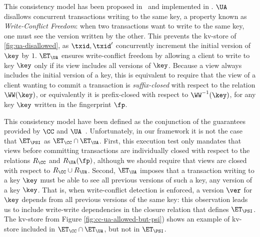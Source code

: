 This consistency model has been proposed in~\cite{framework-concur} 
and implemented in \cite{rola}.
$\UA$ disallows concurrent transactions writing to the same key,
a property known as \emph{Write-Conflict Freedom}:  
when two transactions want to write to the same key, one must see the version 
written by the other.
This prevents the kv-store of \cref{fig:ua-disallowed},
as $\txid, \txid'$ concurrently increment the initial version of $\key$ by $1$.
$\ET_\UA$ ensures write-conflict freedom by allowing a client to write to key $\key$
only if its view includes all versions of $\key$. Because a view always includes the 
initial version of a key, this is equivalent to require that the view of a client wanting 
to commit a transaction is \emph{suffix-closed} with respect to the relation $\WW(\key)$, 
or equivalently it is prefix-closed with respect to $\WW^{-1}(\key)$, for any key $\key$ written in the 
fingerprint $\fp$.

This consistency model have been defined as the conjunction of the guarantees provided by $\CC$ and $\UA$~\cite{framework-concur}. 
Unfortunately, in our framework it is not the case that $\ET_{\PSI}$ as $\ET_{\CC} \cap \ET_{\UA}$. First,  
this execution test only mandates that views before committing transactions are individually closed with respect to 
the relations $R_{\CC}$ and $R_{\UA}(\fp)$, although we should require that views are closed with respect to 
$R_{\CC} \cup R_{\UA}$. Second, $\ET_{\UA}$ imposes that a transaction writing 
to a key $\key$ must be able to see all previous versions of such a key, \ie any version of a key $\key$. 
That is, when write-conflict detection is enforced, a version $\ver$ for $\key$ depends from all 
previous versions of the same key: this observation leads us to include write-write dependencies 
in the closure relation that defines $\ET_{\PSI}$. The kv-store from Figure
\cref{fig:cc-ua-allowed-but-psi}) shows an example of kv-store included in $\ET_{\CC} \cap \ET_{\UA}$, 
but not in $\ET_{\PSI}$.

